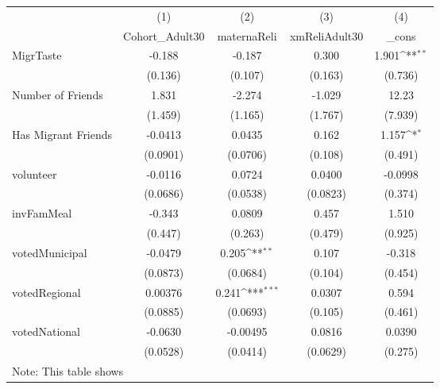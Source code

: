 {
\def\sym#1{\ifmmode^{#1}\else\(^{#1}\)\fi}
\begin{tabular}{l*{4}{c}}
\hline\hline
            &\multicolumn{1}{c}{(1)}&\multicolumn{1}{c}{(2)}&\multicolumn{1}{c}{(3)}&\multicolumn{1}{c}{(4)}\\
            &\multicolumn{1}{c}{Cohort\_Adult30}&\multicolumn{1}{c}{maternaReli}&\multicolumn{1}{c}{xmReliAdult30}&\multicolumn{1}{c}{\_cons}\\
\hline
MigrTaste   &      -0.188         &      -0.187         &       0.300         &       1.901\sym{**} \\
            &     (0.136)         &     (0.107)         &     (0.163)         &     (0.736)         \\
[1em]
Number of Friends&       1.831         &      -2.274         &      -1.029         &       12.23         \\
            &     (1.459)         &     (1.165)         &     (1.767)         &     (7.939)         \\
[1em]
Has Migrant Friends&     -0.0413         &      0.0435         &       0.162         &       1.157\sym{*}  \\
            &    (0.0901)         &    (0.0706)         &     (0.108)         &     (0.491)         \\
[1em]
volunteer   &     -0.0116         &      0.0724         &      0.0400         &     -0.0998         \\
            &    (0.0686)         &    (0.0538)         &    (0.0823)         &     (0.374)         \\
[1em]
invFamMeal  &      -0.343         &      0.0809         &       0.457         &       1.510         \\
            &     (0.447)         &     (0.263)         &     (0.479)         &     (0.925)         \\
[1em]
votedMunicipal&     -0.0479         &       0.205\sym{**} &       0.107         &      -0.318         \\
            &    (0.0873)         &    (0.0684)         &     (0.104)         &     (0.454)         \\
[1em]
votedRegional&     0.00376         &       0.241\sym{***}&      0.0307         &       0.594         \\
            &    (0.0885)         &    (0.0693)         &     (0.105)         &     (0.461)         \\
[1em]
votedNational&     -0.0630         &    -0.00495         &      0.0816         &      0.0390         \\
            &    (0.0528)         &    (0.0414)         &    (0.0629)         &     (0.275)         \\
\hline\hline
\multicolumn{5}{l}{\footnotesize Note: This table shows}\\
\end{tabular}
}
